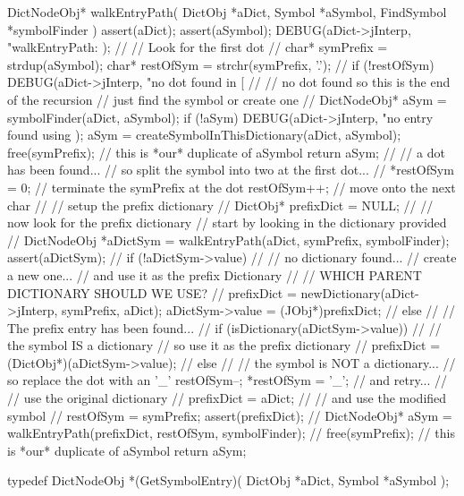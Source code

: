 \startCCode
DictNodeObj* walkEntryPath(
  DictObj    *aDict,
  Symbol     *aSymbol,
  FindSymbol *symbolFinder
) {
  assert(aDict);
  assert(aSymbol);
  DEBUG(aDict->jInterp,
    "walkEntryPath: %
  );
  //
  // Look for the first dot
  //
  char* symPrefix = strdup(aSymbol);
  char* restOfSym = strchr(symPrefix, '.');
  //
  if (!restOfSym) {
    DEBUG(aDict->jInterp, "no dot found in [%
    //
    // no dot found so this is the end of the recursion
    // just find the symbol or create one
    //
    DictNodeObj* aSym = symbolFinder(aDict, aSymbol);
    if (!aSym) {
      DEBUG(aDict->jInterp,
        "no entry found using %
      );
      aSym = createSymbolInThisDictionary(aDict, aSymbol);
    }
    free(symPrefix); // this is *our* duplicate of aSymbol
    return aSym;
  }
  //
  // a dot has been found...
  // so split the symbol into two at the first dot...
  //
  *restOfSym = 0; // terminate the symPrefix at the dot
  restOfSym++;    // move onto the next char
  //
  // setup the prefix dictionary
  //
  DictObj* prefixDict = NULL;
  //
  // now look for the prefix dictionary
  // start by looking in the dictionary provided
  //
  DictNodeObj *aDictSym =
    walkEntryPath(aDict, symPrefix, symbolFinder);
  assert(aDictSym);
  //
  if (!aDictSym->value) {
    //
    // no dictionary found...
    // create a new one...
    // and use it as the prefix Dictionary
    //
    // WHICH PARENT DICTIONARY SHOULD WE USE?
    //
    prefixDict = 
      newDictionary(aDict->jInterp, symPrefix, aDict);
    aDictSym->value = (JObj*)prefixDict;
    //
  } else {
    //
    // The prefix entry has been found...
    //
    if (isDictionary(aDictSym->value)) {
      //
      // the symbol IS a dictionary
      // so use it as the prefix dictionary
      //
      prefixDict = (DictObj*)(aDictSym->value);
      //
    } else {
      //
      // the symbol is NOT a dictionary...
      // so replace the dot with an '_'
      restOfSym--;
      *restOfSym = '_';
      // and retry...
      //
      // use the original dictionary
      //
      prefixDict = aDict;
      //
      // and use the modified symbol
      //
      restOfSym = symPrefix;
    }
  }
  assert(prefixDict);
  //
  DictNodeObj* aSym =
    walkEntryPath(prefixDict, restOfSym, symbolFinder);
  //
  free(symPrefix); // this is *our* duplicate of aSymbol
  return aSym;
}
\stopCCode

\startCHeader
typedef DictNodeObj *(GetSymbolEntry)(
  DictObj *aDict,
  Symbol  *aSymbol
);

